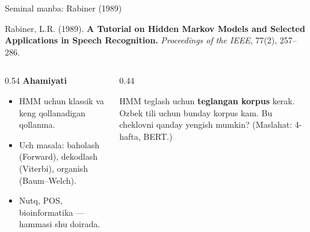 \documentclass[aspectratio=169,11pt]{beamer}
\newcommand{\uzq}{\textquotesingle{}}
\begin{document}
\begin{frame}{Seminal manba: Rabiner (1989)}
\footnotesize

\begin{tcolorbox}[defbox,left=2mm,right=2mm,top=1mm,bottom=1mm]
\small
Rabiner, L.R. (1989). \textbf{A Tutorial on Hidden Markov Models and Selected
Applications in Speech Recognition.} \textit{Proceedings of the IEEE}, 77(2), 257--286.
\end{tcolorbox}

\vspace{3pt}
\begin{columns}[T,totalwidth=\textwidth]
\begin{column}{0.54\textwidth}
\textbf{Ahamiyati}
\begin{itemize}\setlength\itemsep{2pt}
  \item HMM uchun klassik va keng qo\uzq{}llanadigan qo\uzq{}llanma.
  \item Uch masala: baholash (Forward), dekodlash (Viterbi),
        o\uzq{}rganish (Baum--Welch).
  \item Nutq, POS, bioinformatika --- hammasi shu doirada.
\end{itemize}

\vspace{2pt}
\centering
{}
\end{column}

\begin{column}{0.44\textwidth}
\begin{tcolorbox}[warnbox,title=Muhokama savoli (5-amaliyotgacha o\uzq{}ylang),left=2mm,right=2mm,top=1mm,bottom=1mm]
HMM teglash uchun \textbf{teglangan korpus} kerak. O\uzq{}zbek tili uchun bunday
korpus kam. Bu cheklovni qanday yengish mumkin? (Maslahat: 4-hafta, BERT.)
\end{tcolorbox}
\end{column}
\end{columns}

\end{frame}
\end{document}
